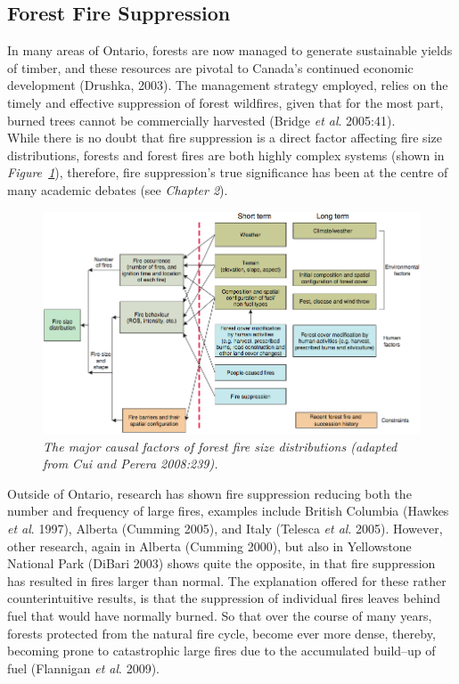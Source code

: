 \begin{spacing}{1.5}
\subsection{Forest Fire Suppression}
In many areas of Ontario, forests are now managed to generate sustainable yields of timber, and these resources are pivotal to Canada's continued economic development (Drushka, 2003). The management strategy employed, relies on the timely and effective suppression of  forest wildfires, given that for the most part, burned trees cannot be commercially harvested (Bridge \emph{et al}. 2005:41). \\

\noindent While there is no doubt that fire suppression is a direct factor affecting fire size distributions, forests and forest fires are both highly complex systems (shown in \emph{Figure~\ref{fig1}}), therefore, fire suppression's true significance has been at the centre of many academic debates (see \emph{Chapter 2}). \\

\begin{figure}[h!]
  \centering
    \includegraphics[width=1\textwidth]{media/fig1}
      \caption[Major causal factors of fire size distributions]{\emph{The major causal factors of forest fire size distributions (adapted from Cui and Perera 2008:239).}}
        \label{fig1}
\end{figure}

\noindent Outside of Ontario, research has shown fire suppression reducing both the number and frequency of large fires, examples include British Columbia (Hawkes \emph{et al}. 1997), Alberta (Cumming 2005), and Italy (Telesca \emph{et al}. 2005). However, other research, again in Alberta (Cumming 2000), but also in Yellowstone National Park (DiBari 2003) shows quite the opposite, in that fire suppression has resulted in fires larger than normal. The explanation offered for these rather counterintuitive results, is that the suppression of individual fires leaves behind fuel that would have normally burned. So that over the course of many years, forests protected from the natural fire cycle, become ever more dense, thereby, becoming prone to catastrophic large fires due to the accumulated build--up of fuel (Flannigan \emph{et al}. 2009). \\


\end{spacing}
